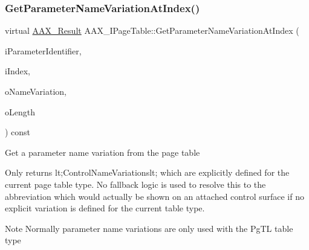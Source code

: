\subsubsection{\texorpdfstring{GetParameterNameVariationAtIndex()}{GetParameterNameVariationAtIndex()}}
{\footnotesize\ttfamily virtual \mbox{\hyperlink{a00392_a4d8f69a697df7f70c3a8e9b8ee130d2f}{A\+A\+X\+\_\+\+Result}} A\+A\+X\+\_\+\+I\+Page\+Table\+::\+Get\+Parameter\+Name\+Variation\+At\+Index (\begin{DoxyParamCaption}\item[{\mbox{\hyperlink{a00392_ab4e01b971dac1b25632fd9f710dd8f77}{A\+A\+X\+\_\+\+C\+Page\+Table\+Param\+ID}}}]{i\+Parameter\+Identifier,  }\item[{int32\+\_\+t}]{i\+Index,  }\item[{\mbox{\hyperlink{a01873}{A\+A\+X\+\_\+\+I\+String}} \&}]{o\+Name\+Variation,  }\item[{int32\+\_\+t \&}]{o\+Length }\end{DoxyParamCaption}) const\hspace{0.3cm}{\ttfamily [pure virtual]}}

Get a parameter name variation from the page table

Only returns {\ttfamily lt;Control\+Name\+Variationslt;} which are explicitly defined for the current page table type. No fallback logic is used to resolve this to the abbreviation which would actually be shown on an attached control surface if no explicit variation is defined for the current table type.

\begin{DoxyNote}{Note}
Normally parameter name variations are only used with the {\ttfamily \textquotesingle{}Pg\+TL\textquotesingle{}} table type
\end{DoxyNote}


